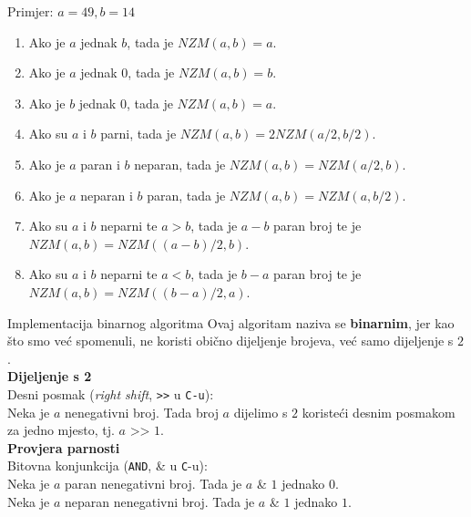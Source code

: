\documentclass[xcolor=dvipsnames, notheorems]{beamer}
\theoremstyle{plain} %
\theoremstyle{definition} %
\begin{document}
\begin{frame}{Primjer: $a = 49, b = 14$}
\begin{enumerate}
\item \alert<4>{Ako je $a$ jednak $b$, tada je $NZM(a,b) = a$.}\\
\item Ako je $a$ jednak $0$, tada je $NZM(a,b) = b$. \\
\item Ako je $b$ jednak $0$, tada je $NZM(a,b) = a$.\\
\item Ako su $a$ i $b$ parni, tada je $NZM(a,b) = 2 NZM(a/2, b/2)$.\\
\item Ako je $a$ paran i $b$ neparan, tada je $NZM(a,b) = NZM(a/2, b).$\\
\item \alert<1>{Ako je $a$ neparan i $b$ paran, tada je $NZM(a,b) = NZM(a, b/2)$.}\\
\item \alert<2,3>{Ako su $a$ i $b$ neparni te $a > b$, tada je $a - b$ paran broj te je $NZM(a,b) = NZM((a-b)/2,b)$.}\\
\item Ako su $a$ i $b$ neparni te $a < b$, tada je $b - a$ paran broj te je $NZM(a,b) = NZM((b-a)/2,a)$.
\end{enumerate}
\end{frame}
\begin{frame}{Implementacija binarnog algoritma}
Ovaj algoritam naziva se \textbf{binarnim}, jer kao što smo već spomenuli, ne koristi obično dijeljenje brojeva, već samo dijeljenje s $2$. \\  
\textbf{Dijeljenje s 2}\\
Desni posmak (\emph{right shift}, \texttt{>>} u \texttt{C-u}):\\
Neka je $a$ nenegativni broj. Tada broj $a$ dijelimo s $2$ koristeći desnim posmakom za jedno mjesto, tj. $a\texttt{ >> } 1$.\\
\textbf{Provjera parnosti}\\
Bitovna konjunkcija (\texttt{AND}, \& u \texttt{C}-u):\\
Neka je $a$ paran nenegativni broj. Tada je $a$ \& $1$ jednako $0$.\\
Neka je $a$ neparan nenegativni broj. Tada je $a$ \& $1$ jednako $1$.\\
\end{frame}    
\end{document}
